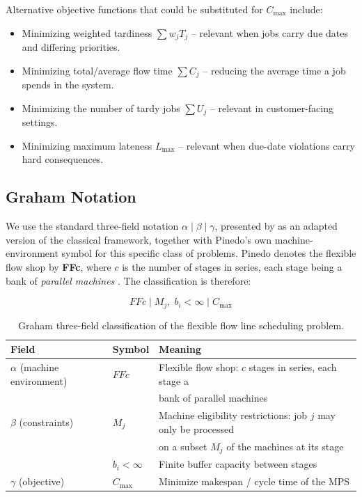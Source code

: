 \documentclass[11pt,a4paper]{article}
\begin{document}
Alternative objective functions that could be substituted for $C_{\max}$
include:

\begin{itemize}
  \item Minimizing weighted tardiness $\sum w_j T_j$ -- relevant when jobs
    carry due dates and differing priorities.
  \item Minimizing total/average flow time $\sum C_j$ -- reducing the
    average time a job spends in the system.
  \item Minimizing the number of tardy jobs $\sum U_j$ -- relevant in
    customer-facing settings.
  \item Minimizing maximum lateness $L_{\max}$ -- relevant when due-date
    violations carry hard consequences.
\end{itemize}

\subsection{Graham Notation}

We use the standard three-field notation $\alpha \mid \beta \mid \gamma$,
presented by \citet{pinedo2016scheduling} as an adapted version of the
classical framework, together with Pinedo's own machine-environment
symbol for this specific class of problems. Pinedo denotes the flexible
flow shop by \textbf{FFc}, where $c$ is the number of stages in series,
each stage being a bank of \emph{parallel machines}
\citep{pinedo2016scheduling}. The classification is therefore:

\begin{equation*}
  \boxed{\;FFc \mid M_j,\; b_i < \infty \mid C_{\max}\;}
\end{equation*}

\begin{table}[h!]
\centering
\begin{tabular}{@{}lll@{}}
\toprule
\textbf{Field} & \textbf{Symbol} & \textbf{Meaning} \\
\midrule
$\alpha$ (machine environment) & $FFc$ & Flexible flow shop: $c$ stages in
  series, each stage a \\
  & & bank of parallel machines \citep{pinedo2016scheduling} \\
$\beta$ (constraints) & $M_j$ & Machine eligibility restrictions: job $j$
  may only be processed \\
  & & on a subset $M_j$ of the machines at its stage
  \citep{pinedo2016scheduling} \\
 & $b_i < \infty$ & Finite buffer capacity between stages
  \citep{mccormick1989sequencing} \\
$\gamma$ (objective) & $C_{\max}$ & Minimize makespan / cycle time of the
  MPS \\
\bottomrule
\end{tabular}
\caption{Graham three-field classification of the flexible flow line
  scheduling problem.}
\end{table}
\end{document}
